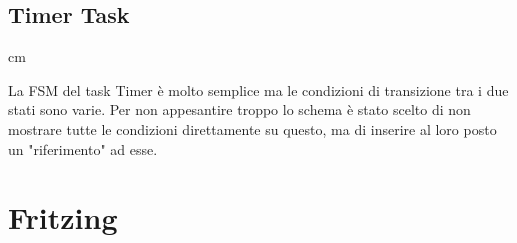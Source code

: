 \documentclass{article}
\begin{document}
\subsection{Timer Task}
 cm
\begin{center}
\end{center}
La FSM del task Timer è molto semplice ma le condizioni di transizione tra i due stati sono varie. Per non appesantire troppo lo schema è stato scelto di non mostrare tutte le condizioni direttamente su questo, ma di inserire al loro posto un "riferimento" ad esse.

\newpage


\section{Fritzing}
\hfill
\begin{center}
\end{center}

\newpage
\end{document}
